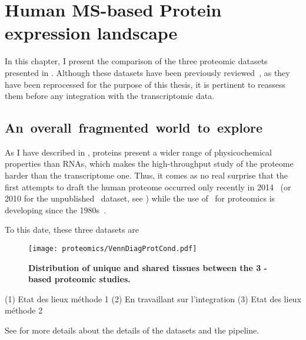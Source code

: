\chapter{Human MS-based Protein expression landscape}\label{ch:proteomics}


In this chapter, I present the comparison of
the three proteomic datasets presented in .
Although these datasets have been previously
reviewed~,
as they have been reprocessed for the purpose of this thesis,
it is pertinent to reassess them before any integration with the transcriptomic data.

\section{An~overall~fragmented~world~to~explore}

As I have described in ,
proteins present a wider range of physicochemical properties than \glspl{RNA},
which makes the high-throughput study of the proteome
harder than the transcriptome one.
Thus, it comes as no real surprise that
the first attempts to draft the human proteome occurred only recently
in 2014~
(or 2010 for the unpublished \cutler\ dataset, see )
while the use of \ms\ for proteomics is developing since the 1980s~.

To this date,
these three datasets are 

\begin{figure}[htpb]
    \texttt{[image: proteomics/VennDiagProtCond.pdf]}\centering
    \caption[Distribution of unique shared tissues between
    the 3 MS-based proteomic studies]{\label{fig:VennDiagProt3}\textbf{Distribution
    of unique and shared tissues between the 3 \ms{}-based proteomic studies.}}
\end{figure}








(1) Etat des lieux méthode 1
(2) En travaillant sur l'integration 
(3) Etat des lieux méthode 2

See  for more details about the details of the datasets and
the pipeline.

